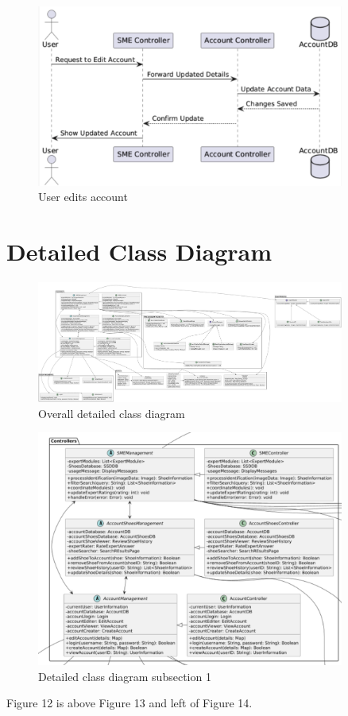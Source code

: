 \documentclass[]{article}
\begin{document}
\begin{figure}[H]
    \centering
    \includegraphics[width=0.9\textwidth]{S3/image (7).png}
	\caption{User edits account}
\end{figure}




\section{Detailed Class Diagram}
\label{sec:detailed_class_diagram}
\begin{figure}[H]
    \centering
    \includegraphics[width=0.9\textwidth]{fullDiagram.png}
	\caption{Overall detailed class diagram}
\end{figure} 

\begin{figure}[H]
    \centering
    \includegraphics[width=0.9\textwidth]{figure1.png}
	\caption{Detailed class diagram subsection 1}
\end{figure}
Figure 12 is above Figure 13 and left of Figure 14.
\end{document}
